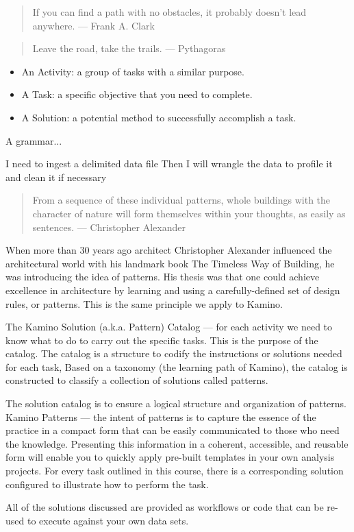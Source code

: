 \begin{quote}
If you can find a path with no obstacles, it probably doesn’t lead anywhere.
— Frank A. Clark
\end{quote}

\begin{quote}
Leave the road, take the trails.
— Pythagoras
\end{quote}

\begin{itemize}
\item An Activity: a group of tasks with a similar purpose.
\item A Task: a specific objective that you need to complete.
\item A Solution: a potential method to successfully accomplish a task.
\end{itemize}

A grammar...

I need to ingest a delimited data file
Then I will wrangle the data to profile it and clean it if necessary

\begin{quote}
From a sequence of these individual patterns, whole buildings with the
character of nature will form themselves within your thoughts, as easily
as sentences. — Christopher Alexander
\end{quote}

When more than 30 years ago architect Christopher Alexander influenced the architectural world with his landmark book The Timeless Way of Building, he was introducing the idea of patterns. His thesis was that one could achieve excellence in architecture by learning and using a carefully-defined set of design rules, or patterns. This is the same principle we apply to Kamino.

The Kamino Solution (a.k.a. Pattern) Catalog --- for each activity we need to know what to do to carry out the specific tasks. This is the purpose of the catalog. The catalog is a structure to codify the instructions or solutions needed for each task, Based on a taxonomy (the learning path of Kamino), the catalog is constructed to classify a collection of
solutions called patterns.

The solution catalog is to ensure a logical structure and organization of patterns. Kamino Patterns --- the intent of patterns is to capture the essence of the practice in a compact form that can be easily communicated to those who need the knowledge. Presenting this information in a coherent, accessible, and reusable form will enable you to quickly apply pre-built templates in your own analysis projects. For every task outlined in this course, there is a corresponding solution configured to illustrate how to perform the task.

All of the solutions  discussed are provided as workflows or code that can be re-used to execute against your own data sets.  
